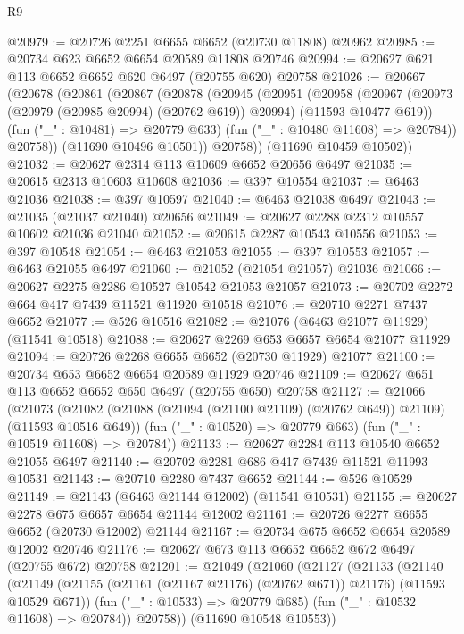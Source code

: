 \begin{lexlean}{R9}
\begin{coremodule}
@20979 := @20726 @2251 @6655 @6652 (@20730 @11808) @20962
@20985 := @20734 @623 @6652 @6654 @20589 @11808 @20746
@20994 := @20627 @621 @113 @6652 @6652 @620 @6497 (@20755 @620) @20758
@21026 := @20667
    (@20678
      (@20861
        (@20867
          (@20878
            (@20945
              (@20951
                (@20958
                  (@20967
                    (@20973 (@20979 (@20985 @20994) (@20762 @619)) @20994)
                    (@11593 @10477 @619))
                  (fun ("_" : @10481) => @20779 @633)
                  (fun ("_" : @10480 @11608) => @20784))
                @20758))
            (@11690 @10496 @10501))
          @20758))
      (@11690 @10459 @10502))
@21032 := @20627 @2314 @113 @10609 @6652 @20656 @6497
@21035 := @20615 @2313 @10603 @10608
@21036 := @397 @10554
@21037 := @6463 @21036
@21038 := @397 @10597
@21040 := @6463 @21038 @6497
@21043 := @21035 (@21037 @21040) @20656
@21049 := @20627 @2288 @2312 @10557 @10602 @21036 @21040
@21052 := @20615 @2287 @10543 @10556
@21053 := @397 @10548
@21054 := @6463 @21053
@21055 := @397 @10553
@21057 := @6463 @21055 @6497
@21060 := @21052 (@21054 @21057) @21036
@21066 := @20627 @2275 @2286 @10527 @10542 @21053 @21057
@21073 := @20702 @2272 @664 @417 @7439 @11521 @11920 @10518
@21076 := @20710 @2271 @7437 @6652
@21077 := @526 @10516
@21082 := @21076 (@6463 @21077 @11929) (@11541 @10518)
@21088 := @20627 @2269 @653 @6657 @6654 @21077 @11929
@21094 := @20726 @2268 @6655 @6652 (@20730 @11929) @21077
@21100 := @20734 @653 @6652 @6654 @20589 @11929 @20746
@21109 := @20627 @651 @113 @6652 @6652 @650 @6497 (@20755 @650) @20758
@21127 := @21066
    (@21073
      (@21082 (@21088 (@21094 (@21100 @21109) (@20762 @649)) @21109) (@11593 @10516 @649))
      (fun ("_" : @10520) => @20779 @663)
      (fun ("_" : @10519 @11608) => @20784))
@21133 := @20627 @2284 @113 @10540 @6652 @21055 @6497
@21140 := @20702 @2281 @686 @417 @7439 @11521 @11993 @10531
@21143 := @20710 @2280 @7437 @6652
@21144 := @526 @10529
@21149 := @21143 (@6463 @21144 @12002) (@11541 @10531)
@21155 := @20627 @2278 @675 @6657 @6654 @21144 @12002
@21161 := @20726 @2277 @6655 @6652 (@20730 @12002) @21144
@21167 := @20734 @675 @6652 @6654 @20589 @12002 @20746
@21176 := @20627 @673 @113 @6652 @6652 @672 @6497 (@20755 @672) @20758
@21201 := @21049
    (@21060
      (@21127
        (@21133
          (@21140
            (@21149 (@21155 (@21161 (@21167 @21176) (@20762 @671)) @21176) (@11593 @10529 @671))
            (fun ("_" : @10533) => @20779 @685)
            (fun ("_" : @10532 @11608) => @20784))
          @20758))
      (@11690 @10548 @10553))

\end{coremodule}
\end{lexlean}
